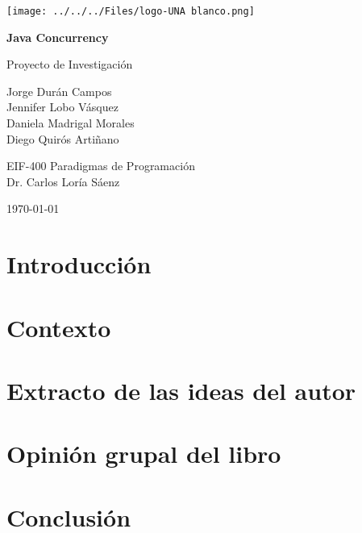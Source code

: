 \documentclass[11pt, article, natbib]{article}
\begin{document}
\begin{titlepage}
	\texttt{[image: ../../../Files/logo-UNA blanco.png]}      
   	\begin{changemargin}{4.5cm}{0cm}
       	\textbf{\huge Java Concurrency}

       	\vspace{0.2cm}
       	\LARGE Proyecto de Investigación
            
       	\vspace{3cm}
		\Large
        Jorge Durán Campos \\
        Jennifer Lobo Vásquez \\
        Daniela Madrigal Morales \\
       	Diego Quirós Artiñano \\

       	\vspace{3cm}
       
		EIF-400 Paradigmas de Programación \\
       	Dr. Carlos Loría Sáenz \\

       	\vfill
    	
		\today
	\end{changemargin}
\end{titlepage}

\onecolumn
    \renewcommand{\contentsname}{\large Índice \\ \hrulefill}
\tableofcontents
\newpage

\section{Introducción}

\newpage
\section{Contexto}

\section{Extracto de las ideas del autor}

\section{Opinión grupal del libro}

\newpage
\section{Conclusión}


\newpage
\onecolumn

\nocite{temp}
%  
% 
\printbibliography
\end{document}

